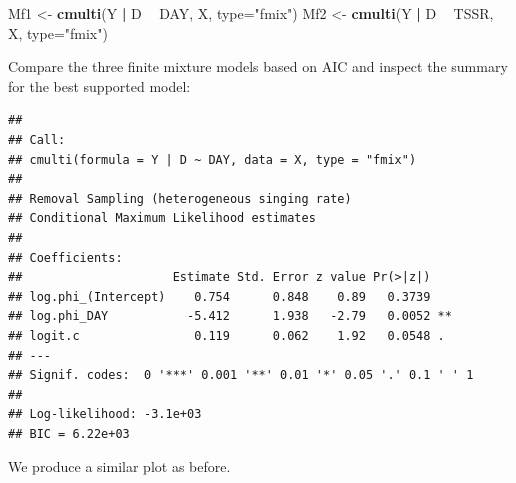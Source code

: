 \documentclass[12pt,]{book}
\newenvironment{Shaded}{\begin{snugshade}}{\end{snugshade}}
\newcommand{\DataTypeTok}[1]{\textcolor[rgb]{0.13,0.29,0.53}{#1}}
\newcommand{\DecValTok}[1]{\textcolor[rgb]{0.00,0.00,0.81}{#1}}
\newcommand{\KeywordTok}[1]{\textcolor[rgb]{0.13,0.29,0.53}{\textbf{#1}}}
\newcommand{\NormalTok}[1]{#1}
\newcommand{\OperatorTok}[1]{\textcolor[rgb]{0.81,0.36,0.00}{\textbf{#1}}}
\newcommand{\StringTok}[1]{\textcolor[rgb]{0.31,0.60,0.02}{#1}}
\begin{document}
\begin{Shaded}
\begin{Highlighting}[]
\NormalTok{Mf1 <-}\StringTok{ }\KeywordTok{cmulti}\NormalTok{(Y }\OperatorTok{|}\StringTok{ }\NormalTok{D }\OperatorTok{~}\StringTok{ }\NormalTok{DAY, X, }\DataTypeTok{type=}\StringTok{"fmix"}\NormalTok{)}
\NormalTok{Mf2 <-}\StringTok{ }\KeywordTok{cmulti}\NormalTok{(Y }\OperatorTok{|}\StringTok{ }\NormalTok{D }\OperatorTok{~}\StringTok{ }\NormalTok{TSSR, X, }\DataTypeTok{type=}\StringTok{"fmix"}\NormalTok{)}
\end{Highlighting}
\end{Shaded}

Compare the three finite mixture models based on AIC and inspect the summary for the best supported
model:

\begin{Shaded}
\end{Shaded}

\begin{verbatim}
## 
## Call:
## cmulti(formula = Y | D ~ DAY, data = X, type = "fmix")
## 
## Removal Sampling (heterogeneous singing rate)
## Conditional Maximum Likelihood estimates
## 
## Coefficients:
##                     Estimate Std. Error z value Pr(>|z|)   
## log.phi_(Intercept)    0.754      0.848    0.89   0.3739   
## log.phi_DAY           -5.412      1.938   -2.79   0.0052 **
## logit.c                0.119      0.062    1.92   0.0548 . 
## ---
## Signif. codes:  0 '***' 0.001 '**' 0.01 '*' 0.05 '.' 0.1 ' ' 1 
## 
## Log-likelihood: -3.1e+03 
## BIC = 6.22e+03
\end{verbatim}

We produce a similar plot as before.
\end{document}
